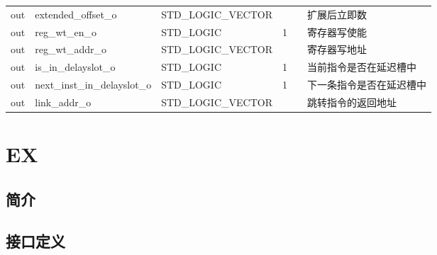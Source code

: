 \documentclass{article}
\begin{document}
\begin{center}
\begin{supertabular}{lllllp{2cm}}
    out & extended_offset_o\label{ID/EX:extended_offset_o} & STD_LOGIC_VECTOR &  &  & 扩展后立即数 \\
    out & reg_wt_en_o\label{ID/EX:reg_wt_en_o} & STD_LOGIC & 1 &  & 寄存器写使能 \\
    out & reg_wt_addr_o\label{ID/EX:reg_wt_addr_o} & STD_LOGIC_VECTOR &  &  & 寄存器写地址 \\
    out & is_in_delayslot_o\label{ID/EX:is_in_delayslot_o} & STD_LOGIC & 1 &  & 当前指令是否在延迟槽中 \\
    out & next_inst_in_delayslot_o\label{ID/EX:next_inst_in_delayslot_o} & STD_LOGIC & 1 &  & 下一条指令是否在延迟槽中 \\
    out & link_addr_o\label{ID/EX:link_addr_o} & STD_LOGIC_VECTOR &  &  & 跳转指令的返回地址 \\
    \end{supertabular}
\end{center}
\FloatBarrier

\section{EX\label{sec:EX}}

\subsection{简介}

\FloatBarrier
\subsection{接口定义}
\end{document}

